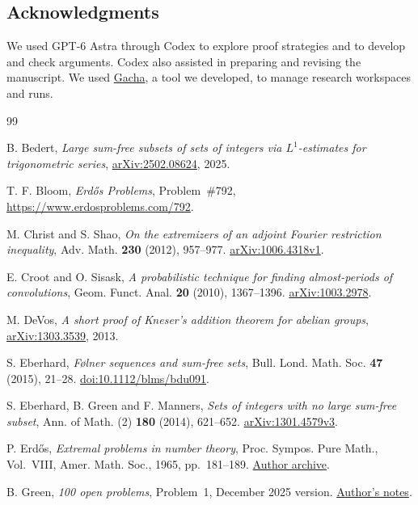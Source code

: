\documentclass[11pt,reqno]{amsart}
\numberwithin{equation}{section}
\begin{document}
\subsection*{Acknowledgments}
We used GPT-6 Astra through Codex to explore proof strategies and to
develop and check arguments. Codex also assisted in preparing and
revising the manuscript. We used
\href{https://github.com/zxl0714/proof-by-gacha}{Gacha}, a tool we
developed, to manage research workspaces and runs.

\clearpage
\begin{thebibliography}{99}
\raggedright

B. Bedert, \emph{Large sum-free subsets of sets of integers via
\(L^1\)-estimates for trigonometric series},
\href{https://arxiv.org/abs/2502.08624}{arXiv:2502.08624}, 2025.

T. F. Bloom, \emph{Erd\H{o}s Problems}, Problem~\#792,
\url{https://www.erdosproblems.com/792}.

M. Christ and S. Shao, \emph{On the extremizers of an adjoint Fourier
restriction inequality}, Adv. Math. \textbf{230} (2012), 957--977.
\href{https://arxiv.org/abs/1006.4318v1}{arXiv:1006.4318v1}.

E. Croot and O. Sisask, \emph{A probabilistic technique for finding
almost-periods of convolutions}, Geom. Funct. Anal. \textbf{20}
(2010), 1367--1396. \href{https://arxiv.org/abs/1003.2978}{arXiv:1003.2978}.

M. DeVos, \emph{A short proof of Kneser's addition theorem for abelian
groups}, \href{https://arxiv.org/abs/1303.3539}{arXiv:1303.3539}, 2013.

S. Eberhard, \emph{F{\o}lner sequences and sum-free sets},
Bull. Lond. Math. Soc. \textbf{47} (2015), 21--28.
\href{https://doi.org/10.1112/blms/bdu091}{doi:10.1112/blms/bdu091}.

S. Eberhard, B. Green and F. Manners, \emph{Sets of integers with no
large sum-free subset}, Ann. of Math. (2) \textbf{180} (2014), 621--652.
\href{https://arxiv.org/abs/1301.4579v3}{arXiv:1301.4579v3}.

P. Erd\H{o}s, \emph{Extremal problems in number theory},
Proc. Sympos. Pure Math., Vol.~VIII, Amer. Math. Soc., 1965,
pp.~181--189. \href{https://renyi.hu/~p_erdos/1965-02.pdf}{Author archive}.

B. Green, \emph{100 open problems}, Problem~1, December 2025 version.
\href{https://people.maths.ox.ac.uk/greenbj/papers/open-problems.pdf}{Author's notes}.


\end{thebibliography}
\end{document}
